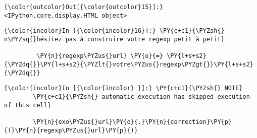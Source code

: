 \begin{Verbatim}[commandchars=\\\{\}]
{\color{outcolor}Out[{\color{outcolor}15}]:} <IPython.core.display.HTML object>
\end{Verbatim}
            
    \begin{Verbatim}[commandchars=\\\{\}]
{\color{incolor}In [{\color{incolor}16}]:} \PY{c+c1}{\PYZsh{} n\PYZsq{}hésitez pas à construire votre regexp petit à petit}
         
         \PY{n}{regexp\PYZus{}url} \PY{o}{=} \PY{l+s+s2}{\PYZdq{}}\PY{l+s+s2}{\PYZlt{}votre\PYZus{}regexp\PYZgt{}}\PY{l+s+s2}{\PYZdq{}}
\end{Verbatim}


    \begin{Verbatim}[commandchars=\\\{\}]
{\color{incolor}In [{\color{incolor} }]:} \PY{c+c1}{\PYZsh{} NOTE}
        \PY{c+c1}{\PYZsh{} automatic execution has skipped execution of this cell}
        
        \PY{n}{exo\PYZus{}url}\PY{o}{.}\PY{n}{correction}\PY{p}{(}\PY{n}{regexp\PYZus{}url}\PY{p}{)}
\end{Verbatim}



    
    
    
